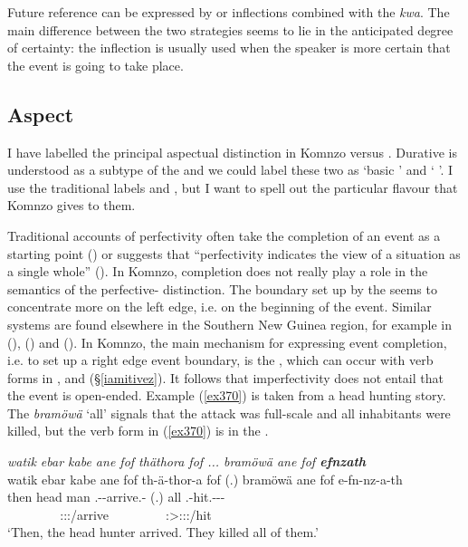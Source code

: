 Future reference can be expressed by  or  inflections combined with the   \emph{kwa}. The main difference between the two strategies seems to lie in the anticipated degree of certainty: the  inflection is usually used when the speaker is more certain that the event is going to take place.

\subsection{Aspect}\label{TAMsemaspect}

I have labelled the principal aspectual distinction in Komnzo  versus . Durative  is understood as a subtype of the  and we could label these two as `basic ' and ` '. I use the traditional labels  and , but I want to spell out the particular flavour that Komnzo gives to them.

Traditional accounts of perfectivity often take the completion of an event as a starting point (\citealt[296]{Frawley:1992wi}) or suggests that ``perfectivity indicates the view of a situation as a single whole'' (\citealt[16]{Comrie:1976vd}). In Komnzo, completion does not really play a role in the semantics of the perfective- distinction. The boundary set up by the  seems to concentrate more on the left edge, i.e. on the beginning of the event. Similar systems are found elsewhere in the Southern New Guinea region, for example in  (\citealt[41]{Drabbe:1955tm}),  (\citealt{Siegel:2015bp}) and  (\citealt{Evans:2015wy}). In Komnzo, the main mechanism for expressing event completion, i.e. to set up a right edge event boundary, is the  , which can occur with verb forms in ,  and   ({\S}\ref{iamitivez}). It follows that imperfectivity does not entail that the event is open-ended. Example (\ref{ex370}) is taken from a head hunting story. The  \emph{bramöwä} `all' signals that the attack was full-scale and all inhabitants were killed, but the verb form in (\ref{ex370}) is in the .

\begin{exe}
	\ex \emph{watik ebar kabe ane fof thäthora fof ... bramöwä ane fof \textbf{efnzath}}\\
	\glll watik ebar kabe ane fof th-ä-thor-a fof (.) bramöwä ane fof e-fn-nz-a-th\\
	then head man {\Dem} {\Emph} \Stnsg.\Gam-\Ndu-arrive.\Rs-\Pst{} {\Emph} (.) all {\Dem} {\Emph} \Stnsg.\Alph-hit.\Ext-\Ndu-\Pst-\Stnsg{}\\
	~ ~ ~ ~ ~ {\footnotesize \Stpl:\Sbj:\Pst:\Pfv/arrive} ~ ~ ~ ~ ~ {\footnotesize \Stpl:\Sbj>\Stpl:\Obj:\Pst:\Ipfv/hit}\\
	\trans `Then, the head hunter arrived. They killed all of them.'
	\label{ex370}
\end{exe}

